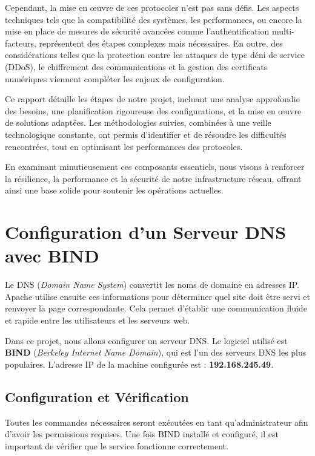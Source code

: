 Cependant, la mise en œuvre de ces protocoles n’est pas sans défis. Les aspects techniques tels que la compatibilité des systèmes, les performances, ou encore la mise en place de mesures de sécurité avancées comme l’authentification multi-facteurs, représentent des étapes complexes mais nécessaires. En outre, des considérations telles que la protection contre les attaques de type déni de service (DDoS), le chiffrement des communications et la gestion des certificats numériques viennent compléter les enjeux de configuration.

Ce rapport détaille les étapes de notre projet, incluant une analyse approfondie des besoins, une planification rigoureuse des configurations, et la mise en œuvre de solutions adaptées. Les méthodologies suivies, combinées à une veille technologique constante, ont permis d’identifier et de résoudre les difficultés rencontrées, tout en optimisant les performances des protocoles.

En examinant minutieusement ces composants essentiels, nous visons à renforcer la résilience, la performance et la sécurité de notre infrastructure réseau, offrant ainsi une base solide pour soutenir les opérations actuelles.
	\newpage
	\tableofcontents
	\newpage
	\listoffigures
	
	\newpage
	
	\section{Configuration d'un Serveur DNS avec BIND}
	
	Le DNS (\textit{Domain Name System}) convertit les noms de domaine en adresses IP. Apache utilise ensuite ces informations pour déterminer quel site doit être servi et renvoyer la page correspondante. Cela permet d’établir une communication fluide et rapide entre les utilisateurs et les serveurs web.
	
	Dans ce projet, nous allons configurer un serveur DNS. Le logiciel utilisé est \textbf{BIND} (\textit{Berkeley Internet Name Domain}), qui est l’un des serveurs DNS les plus populaires. L’adresse IP de la machine configurée est : \textbf{192.168.245.49}.
	
	\subsection*{Configuration et Vérification}
	
	Toutes les commandes nécessaires seront exécutées en tant qu’administrateur afin d’avoir les permissions requises. Une fois BIND installé et configuré, il est important de vérifier que le service fonctionne correctement.
	
